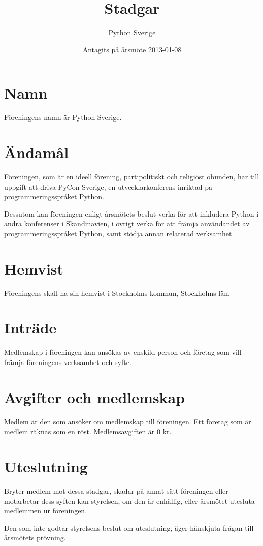 \documentclass[11pt, a4paper]{article}
\title{Stadgar}
\author{Python Sverige}
\date{Antagits på årsmöte 2013-01-08}
\begin{document}
\maketitle


\section{Namn}
Föreningens namn är Python Sverige.

\section{Ändamål}
Föreningen, som är en ideell förening, partipolitiskt och religiöst obunden, har till uppgift att driva PyCon Sverige, en utvecklarkonferens inriktad på programmeringsspråket Python.

Dessutom kan föreningen enligt årsmötets beslut verka för att inkludera Python i andra konferenser i Skandinavien, i övrigt verka för att främja användandet av programmeringsspråket Python, samt stödja annan relaterad verksamhet.

\section{Hemvist}
Föreningens skall ha sin hemvist i Stockholms kommun, Stockholms län.

\section{Inträde}
Medlemskap i föreningen kan ansökas av enskild person och företag som vill främja föreningens verksamhet och syfte.

\section{Avgifter och medlemskap}
Medlem är den som ansöker om medlemskap till föreningen. Ett företag som är medlem räknas som en röst. Medlemsavgiften är 0 kr.

\section{Uteslutning}
Bryter medlem mot dessa stadgar, skadar på annat sätt föreningen eller motarbetar dess syften kan styrelsen, om den är enhällig, eller årsmötet utesluta medlemmen ur föreningen.

Den som inte godtar styrelsens beslut om uteslutning, äger hänskjuta frågan till årsmötets prövning.
\end{document}
